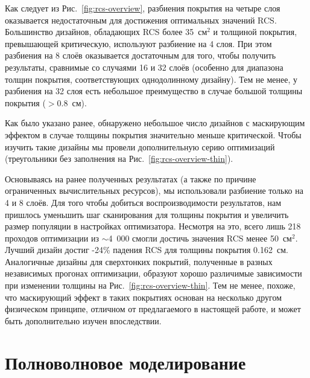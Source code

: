 Как следует из Рис.~\ref{fig:rcs-overview}, разбиения покрытия на
четыре слоя оказывается недостаточным для достижения оптимальных
значений RCS.  Большинство дизайнов, обладающих RCS более 35~см$^2$ и
толщиной покрытия, превышающей критическую, используют разбиение на 4
слоя.  При этом разбиения на 8 слоёв оказывается достаточным для того,
чтобы получить результаты, сравнимые со случаями 16 и 32 слоёв
(особенно для диапазона толщин покрытия, соответствующих однодолинному
дизайну).  Тем не менее, у разбиения на 32 слоя есть небольшое
преимущество в случае большой толщины покрытия (${> 0.8}$~см).

Как было указано ранее, обнаружено небольшое число дизайнов с
маскирующим эффектом в случае толщины покрытия значительно меньше
критической.  Чтобы изучить такие дизайны мы провели дополнительную серию
оптимизаций (треугольники без заполнения на Рис.~\ref{fig:rcs-overview-thin}).
\begin{figure}
\end{figure}
Основываясь на ранее полученных результатах (а также по причине
ограниченных вычислительных ресурсов), мы использовали разбиение
только на 4 и 8 слоёв.  Для того чтобы добиться воспроизводимости
результатов, нам пришлось уменьшить шаг сканирования для толщины
покрытия и увеличить размер популяции в настройках оптимизатора.
Несмотря на это, всего лишь 218 проходов оптимизации из $\sim$4~000
смогли достичь значения RCS менее 50~см$^2$.  Лучший дизайн достиг
-24\% падения RCS для толщины покрытия 0.162~см.  Аналогичные дизайны
для сверхтонких покрытий, полученные в разных независимых прогонах
оптимизации, образуют хорошо различимые зависимости при изменении
толщины на Рис.~\ref{fig:rcs-overview-thin}.  Тем не менее, похоже, что
маскирующий эффект в таких покрытиях основан на несколько другом
физическом принципе, отличном от предлагаемого в настоящей работе, и
может быть дополнительно изучен впоследствии.

\section{Полноволновое моделирование}


